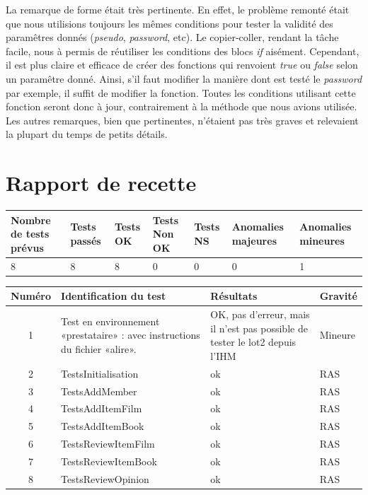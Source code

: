 \documentclass[12pt,a4paper]{report}
\begin{document}
La remarque de forme était très pertinente. En effet, le problème remonté était que nous utilisions toujours les mêmes conditions pour tester la validité des paramêtres donnés (\emph{pseudo}, \emph{password}, etc). Le copier-coller, rendant la tâche facile, nous à permis de réutiliser les conditions des blocs \emph{if} aisément. Cependant, il est plus claire et efficace de créer des fonctions qui renvoient \emph{true} ou \emph{false} selon un paramêtre donné. Ainsi, s'il faut modifier la manière dont est testé le \emph{password} par exemple, il suffit de modifier la fonction. Toutes les conditions utilisant cette fonction seront donc à jour, contrairement à la méthode que nous avions utilisée.\\

Les autres remarques, bien que pertinentes, n'étaient pas très graves et relevaient la plupart du temps de petits détails.

\chapter*{Rapport de recette}
\label{chapter:Rapport de recette} %

\begin{tabular}{|p{2.1cm}|p{1.5cm}|p{1.5cm}|p{1.5cm}|p{1.5cm}|p{2cm}|p{2cm}|}
\hline 
Nombre de tests prévus & Tests passés & Tests OK & Tests Non OK & Tests NS & Anomalies majeures & Anomalies mineures \\ 
\hline 
8 & 8 & 8 & 0 & 0 & 0 & 1 \\ 
\hline 
\end{tabular} 

\begin{tabular}{|c|p{4cm}|p{4cm}|p{4cm}|} 
\hline 
Numéro & Identification du test & Résultats & Gravité \\ 
\hline 
1 & Test en environnement «prestataire» : avec instructions du fichier «alire». & OK, pas d'erreur, mais il n'est pas possible de tester le lot2 depuis l'IHM & Mineure \\ 
\hline 
2 & TestsInitialisation & ok & RAS \\ 
\hline 
3 & TestsAddMember & ok & RAS \\ 
\hline 
4 & TestsAddItemFilm & ok & RAS \\ 
\hline 
5 & TestsAddItemBook & ok & RAS \\ 
\hline 
6 & TestsReviewItemFilm & ok & RAS \\ 
\hline 
7 & TestsReviewItemBook & ok & RAS \\ 
\hline 
8 & TestsReviewOpinion & ok & RAS \\ 
\hline 
\end{tabular}\\
\end{document}
